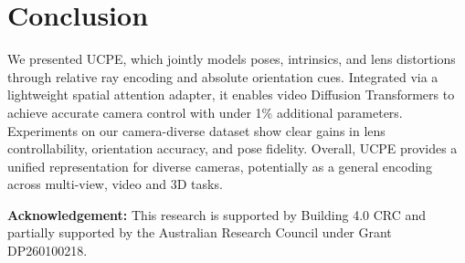 \section{Conclusion}
\label{sec:conclusion}

We presented UCPE, which jointly models poses, intrinsics, and lens distortions through relative ray encoding and absolute orientation cues.
Integrated via a lightweight spatial attention adapter, it enables video Diffusion Transformers to achieve accurate camera control with under 1\% additional parameters.
Experiments on our camera-diverse dataset show clear gains in lens controllability, orientation accuracy, and pose fidelity.
Overall, UCPE provides a unified representation for diverse cameras, potentially as a general encoding across multi-view, video and 3D tasks.


\noindent\textbf{Acknowledgement:}
This research is supported by Building 4.0 CRC and partially supported by the Australian Research Council under Grant DP260100218.
